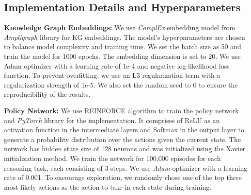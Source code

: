 \subsection{Implementation Details and Hyperparameters} \label{implement}

\noindent \textbf{Knowledge Graph Embeddings: }We use \textit{ComplEx} \cite{Trouillon2016} embedding model from \textit{Ampligraph} \cite{ampligraph} library for KG embeddings. The model's hyperparameters are chosen to balance model complexity and training time. We set the batch size as 50 and train the model for 1000 epochs. The embedding dimension is set to 20. We use Adam optimizer with a learning rate of 1e-4 and negative log-likelihood loss function. %
To prevent overfitting, we use an L3 regularization term with a regularization strength of 1e-5. We also set the random seed to 0 to ensure the reproducibility of the results. %


\noindent \textbf{Policy Network: }We use REINFORCE algorithm to train the policy network and \textit{PyTorch} library for the implementation. It comprises of ReLU as an activation function in the intermediate layers and Softmax in the output layer to generate a probability distribution over the actions given the current state. The network has hidden state size of 128 neurons and was initialized using the Xavier initialization method. %
We train the network for 100,000 episodes %
for each reasoning task, each consisting of 3 steps. We use  \textit{Adam} %
optimizer with a learning rate of 0.001. To encourage exploration, we randomly chose one of the top three most likely actions as the action to take in each state during training. \par

